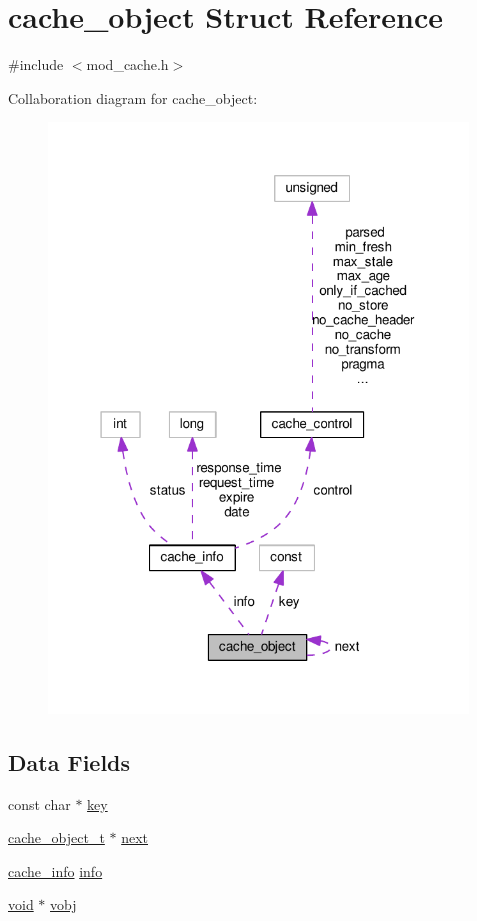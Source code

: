 \hypertarget{structcache__object}{}\section{cache\+\_\+object Struct Reference}
\label{structcache__object}


{\ttfamily \#include $<$mod\+\_\+cache.\+h$>$}



Collaboration diagram for cache\+\_\+object\+:
\nopagebreak
\begin{figure}[H]
\begin{center}
\leavevmode
\includegraphics[width=316pt]{structcache__object__coll__graph}
\end{center}
\end{figure}
\subsection*{Data Fields}
\begin{DoxyCompactItemize}
\item 
const char $\ast$ \hyperlink{structcache__object_a6dfc38a2cd449d6ede42716a80e11f92}{key}
\item 
\hyperlink{group__MOD__CACHE_gaad2b9c797c4773148b3ff5e1485de21e}{cache\+\_\+object\+\_\+t} $\ast$ \hyperlink{structcache__object_a6fb62d2321b20d87b84058fa1ec50a39}{next}
\item 
\hyperlink{structcache__info}{cache\+\_\+info} \hyperlink{structcache__object_ab4b2aae3e314dfa7abe8304c33cedb83}{info}
\item 
\hyperlink{group__MOD__ISAPI_gacd6cdbf73df3d9eed42fa493d9b621a6}{void} $\ast$ \hyperlink{structcache__object_adaac6e5e7bdd26391c8fadfc7588ff40}{vobj}
\end{DoxyCompactItemize}


